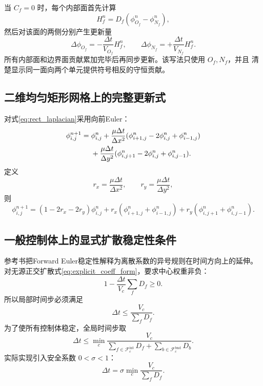 \documentclass[UTF8,12pt,a4paper]{ctexart}
\numberwithin{equation}{section}
\begin{document}
当 $C_f=0$ 时，每个内部面首先计算
\begin{equation}
  H_f^n=D_f(\phi_{O_f}^n-\phi_{N_f}^n),
\end{equation}
然后对该面的两侧分别产生更新量
\begin{equation}
  \boxed{
  \Delta\phi_{O_f}
  =-\frac{\Delta t}{V_{O_f}}H_f^n,
  \qquad
  \Delta\phi_{N_f}
  =+\frac{\Delta t}{V_{N_f}}H_f^n.}
  \label{eq:explicit_coeff_form}
\end{equation}
所有内部面和边界面贡献累加完毕后再同步更新。该写法只使用 $O_f,N_f$，并且
清楚显示同一面向两个单元提供符号相反的守恒贡献。

\subsection{二维均匀矩形网格上的完整更新式}

对式\eqref{eq:rect_laplacian}采用向前Euler：
\begin{align}
  \phi_{i,j}^{n+1}
  ={}&\phi_{i,j}^n
  +\frac{\mu\Delta t}{\Delta x^2}
  (\phi_{i+1,j}^n-2\phi_{i,j}^n+\phi_{i-1,j}^n)
  \notag\\
  &+\frac{\mu\Delta t}{\Delta y^2}
  (\phi_{i,j+1}^n-2\phi_{i,j}^n+\phi_{i,j-1}^n).
  \label{eq:2d_explicit}
\end{align}
定义
\begin{equation}
  r_x=\frac{\mu\Delta t}{\Delta x^2},
  \qquad
  r_y=\frac{\mu\Delta t}{\Delta y^2},
  \label{eq:rx_ry}
\end{equation}
则
\begin{equation}
  \boxed{
  \phi_{i,j}^{n+1}
  =(1-2r_x-2r_y)\phi_{i,j}^n
  +r_x(\phi_{i+1,j}^n+\phi_{i-1,j}^n)
  +r_y(\phi_{i,j+1}^n+\phi_{i,j-1}^n)}.
  \label{eq:2d_explicit_weights}
\end{equation}

\subsection{一般控制体上的显式扩散稳定性条件}

参考书把Forward Euler稳定性解释为离散系数的异号规则在时间方向上的延伸。对无源正交扩散式\eqref{eq:explicit_coeff_form}，要求中心权重非负：
\begin{equation}
  1-\frac{\Delta t}{V_c}\sum_fD_f\geq0.
  \label{eq:positive_center_weight}
\end{equation}
所以局部时间步必须满足
\begin{equation}
  \Delta t\leq\frac{V_c}{\sum_fD_f}.
  \label{eq:local_dt_bound}
\end{equation}
为了使所有控制体稳定，全局时间步取
\begin{equation}
  \boxed{
  \Delta t
  \leq
  \min_c
  \frac{V_c}{
  \displaystyle\sum_{f\in\mathcal F_c^{\mathrm{int}}}D_f
  +\displaystyle\sum_{b\in\mathcal F_c^{\mathrm{bnd}}}D_b}}.
  \label{eq:global_dt_bound}
\end{equation}
实际实现引入安全系数 $0<\sigma<1$：
\begin{equation}
  \boxed{
  \Delta t
  =\sigma
  \min_c
  \frac{V_c}{\sum_fD_f}}.
  \label{eq:safe_dt}
\end{equation}
\end{document}

